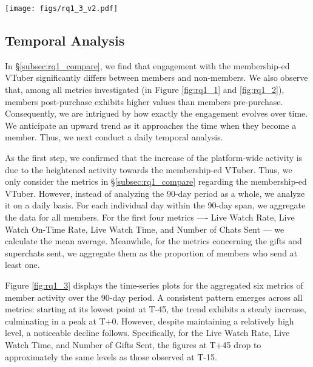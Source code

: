 \begin{figure*}
    \centering
    \texttt{[image: figs/rq1\_3\_v2.pdf]}
    \vspace{-4.5ex}
    \caption{The time-series plots of the activity metrics for members with the membership-ed VTuber.}
    \label{fig:rq1_3}
\end{figure*}

\vspace{-1.5ex}
\subsection{Temporal Analysis}
\label{subsec:rq1_temporal}

In \S\ref{subsec:rq1_compare}, we find that engagement with the membership-ed VTuber significantly differs between members and non-members. 
We also observe that, among all metrics investigated (in Figure \ref{fig:rq1_1} and \ref{fig:rq1_2}),  members post-purchase exhibits higher values than members pre-purchase.
Consequently, we are intrigued by how exactly the engagement evolves over time. 
We anticipate an upward trend as it approaches the time when they become a member. 
Thus, we next conduct a daily temporal analysis. 


As the first step, we confirmed that the increase of the platform-wide activity is due to the heightened activity towards the membership-ed VTuber.
Thus, we only consider the metrics in \S\ref{subsec:rq1_compare} regarding the membership-ed VTuber.
However, instead of analyzing the 90-day period as a whole, we analyze it on a daily basis. For each individual day within the 90-day span, we aggregate the data for all members. For the first four metrics ---- Live Watch Rate, Live Watch On-Time Rate, Live Watch Time, and Number of Chats Sent --- we calculate the mean average. Meanwhile, for the metrics concerning the gifts and superchats sent, we aggregate them as the proportion of members who send at least one.


Figure \ref{fig:rq1_3} displays the time-series plots for the aggregated six metrics of member activity over the 90-day period. A consistent pattern emerges across all metrics: starting at its lowest point at T-45, the trend exhibits a steady increase, culminating in a peak at T+0. However, despite maintaining a relatively high level, a noticeable decline follows.
Specifically, for the Live Watch Rate, Live Watch Time, and Number of Gifts Sent, the figures at T+45 drop to approximately the same levels as those observed at T-15.


